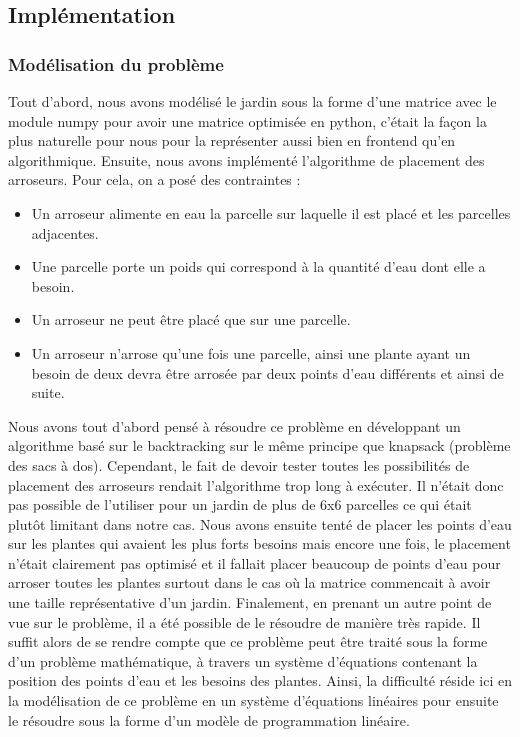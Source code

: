 \documentclass[french,a4paper]{article}
\begin{document}
\subsection{Implémentation}
\subsubsection{Modélisation du problème}
Tout d'abord, nous avons modélisé le jardin sous la forme d'une matrice avec le module numpy pour avoir une matrice optimisée en python, c'était la façon la plus naturelle pour nous pour la représenter aussi bien en frontend qu'en algorithmique.
Ensuite, nous avons implémenté l'algorithme de placement des arroseurs. Pour cela, on a posé des contraintes :
\begin{itemize}
    \item Un arroseur alimente en eau la parcelle sur laquelle il est placé et les parcelles adjacentes.
    \item Une parcelle porte un poids qui correspond à la quantité d'eau dont elle a besoin.
    \item Un arroseur ne peut être placé que sur une parcelle.
    \item Un arroseur n'arrose qu'une fois une parcelle, ainsi une plante ayant un besoin de deux devra être arrosée par deux points d'eau différents et ainsi de suite.
\end{itemize}
Nous avons tout d'abord pensé à résoudre ce problème en développant un algorithme basé sur le backtracking sur le même principe que knapsack (problème des sacs à dos).
Cependant, le fait de devoir tester toutes les possibilités de placement des arroseurs rendait l'algorithme trop long à exécuter. Il n'était donc pas possible de l'utiliser pour un jardin de plus de 6x6 parcelles ce qui était plutôt limitant dans notre cas.
Nous avons ensuite tenté de placer les points d'eau sur les plantes qui avaient les plus forts besoins mais encore une fois, le placement n'était clairement pas optimisé et il fallait placer beaucoup de points d'eau pour arroser toutes les plantes surtout dans le cas où la matrice commencait à avoir une taille représentative d'un jardin.
Finalement, en prenant un autre point de vue sur le problème, il a été possible de le résoudre de manière très rapide.
Il suffit alors de se rendre compte que ce problème peut être traité sous la forme d'un problème mathématique, à travers un système d'équations contenant la position des points d'eau et les besoins des plantes.
Ainsi, la difficulté réside ici en la modélisation de ce problème en un système d'équations linéaires pour ensuite le résoudre sous la forme d'un modèle de programmation linéaire.
\end{document}
